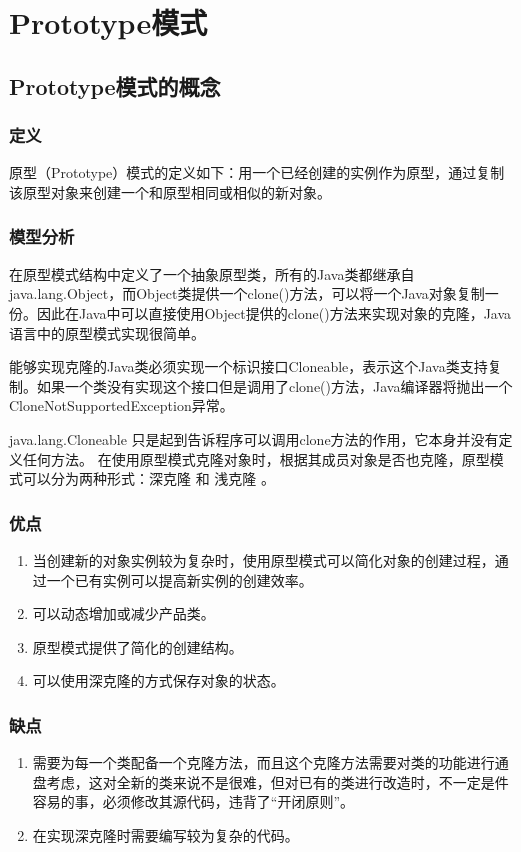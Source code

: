 \chapter{Prototype模式}
\section{Prototype模式的概念}
\subsection{定义}
原型（Prototype）模式的定义如下：用一个已经创建的实例作为原型，通过复制该原型对象来创建一个和原型相同或相似的新对象。
\subsection{模型分析}
在原型模式结构中定义了一个抽象原型类，所有的Java类都继承自java.lang.Object，而Object类提供一个clone()方法，可以将一个Java对象复制一份。因此在Java中可以直接使用Object提供的clone()方法来实现对象的克隆，Java语言中的原型模式实现很简单。
\par
能够实现克隆的Java类必须实现一个标识接口Cloneable，表示这个Java类支持复制。如果一个类没有实现这个接口但是调用了clone()方法，Java编译器将抛出一个CloneNotSupportedException异常。
\par java.lang.Cloneable 只是起到告诉程序可以调用clone方法的作用，它本身并没有定义任何方法。
在使用原型模式克隆对象时，根据其成员对象是否也克隆，原型模式可以分为两种形式：深克隆 和 浅克隆 。
\subsection{优点}
\begin{enumerate}
	\item 当创建新的对象实例较为复杂时，使用原型模式可以简化对象的创建过程，通过一个已有实例可以提高新实例的创建效率。
	\item 可以动态增加或减少产品类。
	\item 原型模式提供了简化的创建结构。
	\item 可以使用深克隆的方式保存对象的状态。
\end{enumerate}
\subsection{缺点}
\begin{enumerate}
	\item 需要为每一个类配备一个克隆方法，而且这个克隆方法需要对类的功能进行通盘考虑，这对全新的类来说不是很难，但对已有的类进行改造时，不一定是件容易的事，必须修改其源代码，违背了“开闭原则”。
	\item 在实现深克隆时需要编写较为复杂的代码。
\end{enumerate}
